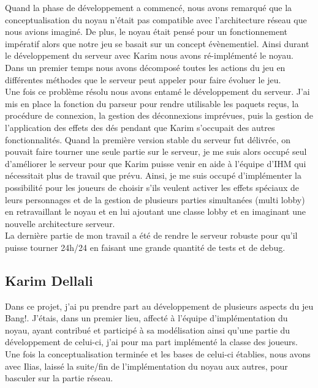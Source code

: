 \documentclass[a4paper,11pt]{article}
\begin{document}
\newpage


Quand la phase de développement a commencé, nous avons remarqué que la conceptualisation du noyau n’était pas compatible avec l'architecture réseau que nous avions imaginé. De plus, le noyau était pensé pour un fonctionnement impératif alors que notre jeu se basait sur un concept évènementiel. Ainsi durant le développement du serveur avec Karim nous avons ré-implémenté le noyau. Dans un premier temps nous avons décomposé toutes les actions du jeu en différentes méthodes que le serveur peut appeler pour faire évoluer le jeu.  \\

Une fois ce problème résolu nous avons entamé le développement du serveur. J’ai mis en place la fonction du parseur pour rendre utilisable les paquets reçus, la procédure de connexion, la gestion des déconnexions imprévues, puis la gestion de l’application des effets des dés pendant que Karim s’occupait des autres fonctionnalités. Quand la première version stable du serveur fut délivrée, on pouvait faire tourner une seule partie sur le serveur, je me suis alors occupé seul d’améliorer le serveur pour que Karim puisse venir en aide à l’équipe d’IHM qui nécessitait plus de travail que prévu. Ainsi, je me suis occupé d'implémenter la possibilité pour les joueurs de choisir s'ils veulent activer les effets spéciaux de leurs personnages et de la gestion de plusieurs parties simultanées (multi lobby) en retravaillant le noyau et en lui ajoutant une classe lobby et en imaginant une nouvelle architecture serveur. \\

La dernière partie de mon travail a été de rendre le serveur robuste pour qu’il puisse tourner 24h/24 en faisant une grande quantité de tests et de debug.

\subsection{Karim Dellali}

Dans ce projet, j’ai pu prendre part au développement de plusieurs aspects du jeu Bang!. J’étais, dans un premier lieu, affecté à l’équipe d’implémentation du noyau, ayant contribué et participé à sa modélisation ainsi qu’une partie du développement de celui-ci, j’ai pour ma part implémenté la classe des joueurs. Une fois la conceptualisation terminée et  les bases de celui-ci établies, nous avons avec Ilias, laissé la suite/fin de l’implémentation du noyau aux autres, pour basculer sur la partie réseau.  \\
\end{document}
